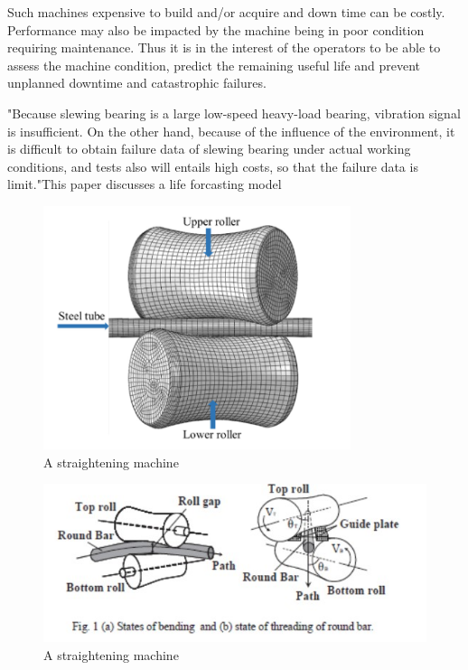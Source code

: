 \documentclass{article}
\begin{document}
Such machines expensive to build and/or acquire and down time can be costly. Performance may also be impacted by the machine being in poor condition requiring maintenance. Thus it is in the interest of the operators to be able to assess the machine condition, predict the remaining useful life and prevent unplanned downtime and catastrophic failures.

"Because slewing bearing is a large low-speed heavy-load bearing, vibration signal is insufficient. On the other hand, because of the influence of the
environment, it is difficult to obtain failure data of slewing bearing under actual working conditions, and tests also will entails high costs, so that the failure data is limit."This paper discusses a life forcasting model~\cite{wang2016multiple}

\begin{figure}[H]
	\centering
	\includegraphics[width=90mm, keepaspectratio]{straightening2.png}
	\caption{A straightening machine~\cite{ma2020effect}}
	\label{straighteningImage2}
\end{figure}

\begin{figure}[H]
	\centering
	\includegraphics[]{straightening1.jpg}
	\caption{A straightening machine~\cite{kato2014straightening}}
	\label{straighteningImage1}
\end{figure}
\end{document}
